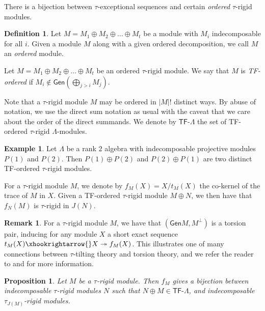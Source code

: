 \documentclass[11pt]{amsart}
\newcommand{\Gen}{\mathsf{Gen}}
\newcommand{\tfo}[1]{\ensuremath{\mathsf{TF}\text{-} #1}}
\newtheorem{proposition}[theorem]{Proposition}
\theoremstyle{definition}
\newtheorem{definition}[theorem]{Definition}
\newtheorem{example}[theorem]{Example}
\newtheorem{remark}[theorem]{Remark}
\begin{document}
There is a bijection between $\tau$-exceptional sequences and certain \textit{ordered} $\tau$-rigid modules.

\begin{definition}
    Let $M = M_1 \oplus M_2 \oplus \dots \oplus M_t$ be a module with $M_i$ indecomposable for all $i$. Given a module $M$ along with a given ordered decomposition, we call $M$ an \textit{ordered} module.

    Let $M = M_1 \oplus M_2 \oplus \dots \oplus M_t$ be an ordered $\tau$-rigid module. We say that $M$ is \textit{TF-ordered} if $M_i \notin \Gen(\bigoplus_{j>i} M_j)$.
    
\end{definition}

Note that a $\tau$-rigid module $M$ may be ordered in $|M|!$ distinct ways. By abuse of notation, we use the direct sum notation as usual with the caveat that we care about the order of the direct summands. We denote by $\tfo{\Lambda}$ the set of TF-ordered $\tau$-rigid $\Lambda$-modules.

\begin{example}
    Let $\Lambda$ be a rank $2$ algebra with indecomposable projective modules $P(1)$ and $P(2)$. Then $P(1) \oplus P(2)$ and $P(2) \oplus P(1)$ are two distinct TF-ordered $\tau$-rigid modules.
\end{example}

For a $\tau$-rigid module $M$, we denote by $f_M(X) = X/t_M(X)$ the co-kernel of the trace of $M$ in $X$. Given a TF-ordered $\tau$-rigid module $M \oplus N$, we then have that $f_N(M)$ is $\tau$-rigid in $J(N)$.

\begin{remark}
    For a $\tau$-rigid module $M$, we have that $(\Gen M,M^\perp)$ is a torsion pair, inducing for any module $X$ a short exact sequence $t_M(X) \xhookrightarrow{} X \twoheadrightarrow f_M(X)$. This illustrates one of many connections between $\tau$-tilting theory and torsion theory, and we refer the reader to \cite{tau} and \cite{dirrt} for more information.
\end{remark}


\begin{proposition}\cite[Prop. 5.6]{tauexceptional_buanmarsh}\label{prop:f_m-bijection-taurigid-J(M)-rigid}
    Let $M$ be a $\tau$-rigid module. Then $f_M$ gives a bijection between indecomposable $\tau$-rigid modules $N$ such that $N \oplus M \in \tfo{\Lambda}$, and indecomposable $\tau_{J(M)}$-rigid modules.
\end{proposition}
\end{document}

